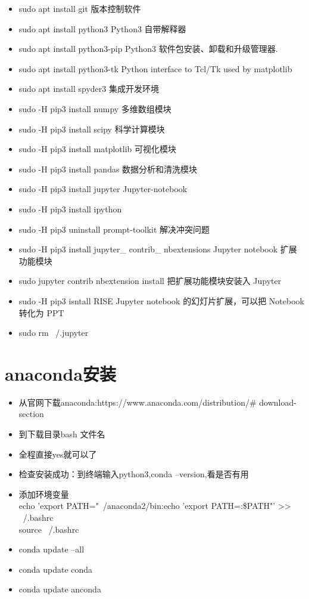 \documentclass[12pt,a4paper]{article}
\begin{document}
	\begin{itemize}
	 \item sudo apt install git     \qquad        版本控制软件 
	 \item sudo apt install python3     \qquad    Python3 自带解释器 
	 \item sudo apt install python3-pip  \qquad   Python3 软件包安装、卸载和升级管理器. 
	 \item sudo apt install python3-tk   \qquad   Python interface to Tcl/Tk used by matplotlib 
	 \item sudo apt install spyder3     \qquad    集成开发环境 
	 \item sudo -H pip3 install numpy      \qquad     多维数组模块 
	 \item sudo -H pip3 install scipy       \qquad 科学计算模块 
	 \item sudo -H pip3 install matplotlib     \qquad 可视化模块
	 \item sudo -H pip3 install pandas         \qquad 数据分析和清洗模块 
	 \item sudo -H pip3 install jupyter \qquad Jupyter-notebook 
	 \item sudo -H pip3 install ipython
	 \item sudo -H pip3 uninstall prompt-toolkit \qquad 解决冲突问题 
	 \item sudo -H pip3 install jupyter\_ contrib\_ nbextensions \qquad Jupyter notebook 扩展功能模块 
	 \item sudo jupyter contrib nbextension install \qquad 把扩展功能模块安装入 Jupyter
	 \item sudo -H pip3 isntall RISE \qquad Jupyter notebook 的幻灯片扩展，可以把 Notebook 转化为 PPT 
	 \item sudo rm ~/.jupyter
	\end{itemize}

	
\section{anaconda安装}
\begin{itemize}
\item 从官网下载anaconda:https://www.anaconda.com/distribution/\# download-section
\item 到下载目录bash 文件名
\item 全程直接yes就可以了
\item 检查安装成功：到终端输入python3,conda --version,看是否有用
\item 添加环境变量　\\
echo 'export PATH="~/anaconda2/bin:echo 'export PATH=:\$PATH"' >> ~/.bashrc \\
source ~/.bashrc
\item conda update --all
\item conda update conda
\item conda update anconda
\end{itemize}
\end{document}
